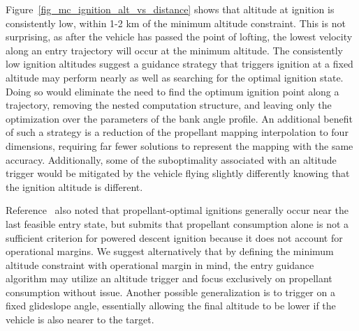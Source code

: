 \documentclass[letterpaper, paper,11pt]{AAS}
\begin{document}
Figure~\ref{fig_mc_ignition_alt_vs_distance} shows that altitude at ignition is consistently low, within 1-2 km of the minimum altitude constraint. This is not surprising, as after the vehicle has passed the point of lofting, the lowest velocity along an entry trajectory will occur at the minimum altitude.
The consistently low ignition altitudes suggest a guidance strategy that triggers ignition at a fixed altitude may perform nearly as well as searching for the optimal ignition state. Doing so would eliminate the need to find the optimum ignition point along a trajectory, removing the nested computation structure, and leaving only the optimization over the parameters of the bank angle profile. An additional benefit of such a strategy is a reduction of the propellant mapping interpolation to four dimensions, requiring far fewer solutions to represent the mapping with the same accuracy. Additionally, some of the suboptimality associated with an altitude trigger would be mitigated by the vehicle flying slightly differently knowing that the ignition altitude is different. 

Reference~\cite{PropellantOptimalAdaptiveTrigger} also noted that propellant-optimal ignitions generally occur near the last feasible entry state, but submits that propellant consumption alone is not a sufficient criterion for powered descent ignition because it does not account for operational margins. We suggest alternatively that by defining the minimum altitude constraint with operational margin in mind, the entry guidance algorithm may utilize an altitude trigger and focus exclusively on propellant consumption without issue. Another possible generalization is to trigger on a fixed glideslope angle, essentially allowing the final altitude to be lower if the vehicle is also nearer to the target.
\end{document}
